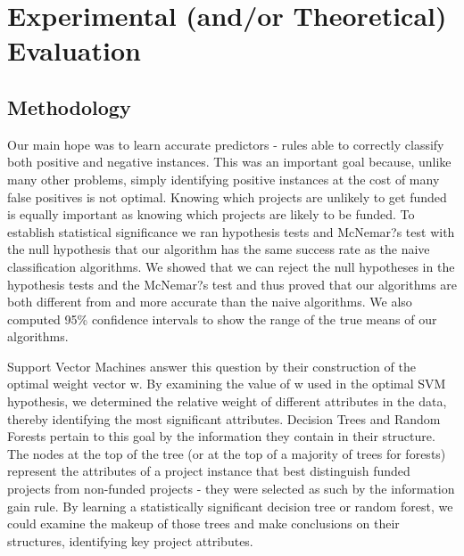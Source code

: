 \documentclass{article}
\begin{document}
\section{Experimental (and/or Theoretical) Evaluation} 
\subsection{Methodology}
Our main hope was to learn accurate predictors - rules able to correctly classify both positive and negative instances. This was an important goal because, unlike many other problems, simply identifying positive instances at the cost of many false positives is not optimal. Knowing which projects are unlikely to get funded is equally important as knowing which projects are likely to be funded. To establish statistical significance we ran hypothesis tests and McNemar?s test with the null hypothesis that our algorithm has the same success rate as the naive classification algorithms. We showed that we can reject the null hypotheses in the hypothesis tests and the McNemar?s test and thus proved that our algorithms are both different from and more accurate than the naive algorithms. We also computed 95\% confidence intervals to show the range of the true means of our algorithms.

Support Vector Machines answer this question by their construction of the optimal weight vector w. By examining the value of w used in the optimal SVM hypothesis, we determined the relative weight of different attributes in the data, thereby identifying the most significant attributes. Decision Trees and Random Forests pertain to this goal by the information they contain in their structure. The nodes at the top of the tree (or at the top of a majority of trees for forests) represent the attributes of a project instance that best distinguish funded projects from non-funded projects - they were selected as such by the information gain rule. By learning a statistically significant decision tree or random forest, we could examine the makeup of those trees and make conclusions on their structures, identifying key project attributes.
\end{document}
